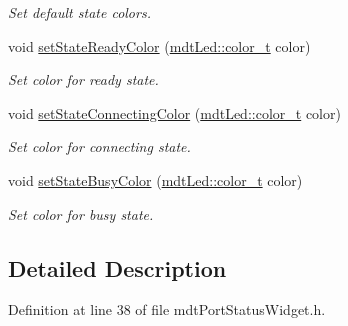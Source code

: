 \begin{DoxyCompactItemize}
\begin{DoxyCompactList}\small\item\em Set default state colors. \end{DoxyCompactList}\item 
\hypertarget{classmdt_port_status_widget_a4930dd9b6e88b3b87cd99d5af25d9707}{
void \hyperlink{classmdt_port_status_widget_a4930dd9b6e88b3b87cd99d5af25d9707}{setStateReadyColor} (\hyperlink{classmdt_led_a2d57d9ef04d2105d2fad93b57fc7cfef}{mdtLed::color\_\-t} color)}
\label{classmdt_port_status_widget_a4930dd9b6e88b3b87cd99d5af25d9707}

\begin{DoxyCompactList}\small\item\em Set color for ready state. \end{DoxyCompactList}\item 
\hypertarget{classmdt_port_status_widget_ac46df457ec12e933c991d2954688c432}{
void \hyperlink{classmdt_port_status_widget_ac46df457ec12e933c991d2954688c432}{setStateConnectingColor} (\hyperlink{classmdt_led_a2d57d9ef04d2105d2fad93b57fc7cfef}{mdtLed::color\_\-t} color)}
\label{classmdt_port_status_widget_ac46df457ec12e933c991d2954688c432}

\begin{DoxyCompactList}\small\item\em Set color for connecting state. \end{DoxyCompactList}\item 
\hypertarget{classmdt_port_status_widget_a5ed8af43258073bf57005232202e3137}{
void \hyperlink{classmdt_port_status_widget_a5ed8af43258073bf57005232202e3137}{setStateBusyColor} (\hyperlink{classmdt_led_a2d57d9ef04d2105d2fad93b57fc7cfef}{mdtLed::color\_\-t} color)}
\label{classmdt_port_status_widget_a5ed8af43258073bf57005232202e3137}

\begin{DoxyCompactList}\small\item\em Set color for busy state. \end{DoxyCompactList}\end{DoxyCompactItemize}


\subsection{Detailed Description}


Definition at line 38 of file mdtPortStatusWidget.h.




